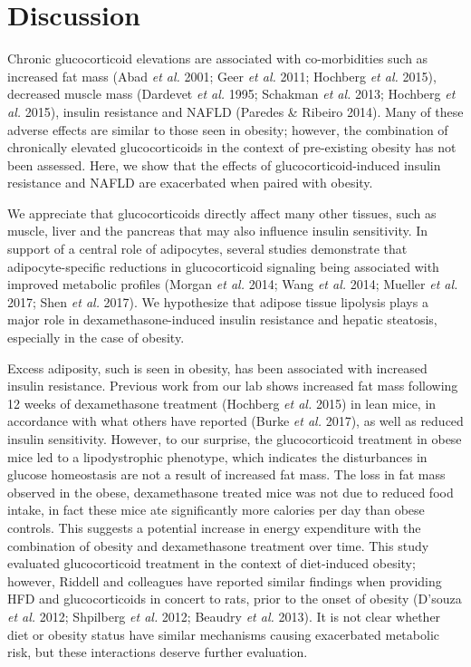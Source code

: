 \documentclass[11pt]{article} %
\begin{document}
\section*{Discussion}

Chronic glucocorticoid elevations are associated with co-morbidities
such as increased fat mass (Abad \emph{et al.} 2001; Geer \emph{et al.}
2011; Hochberg \emph{et al.} 2015), decreased muscle mass (Dardevet
\emph{et al.} 1995; Schakman \emph{et al.} 2013; Hochberg \emph{et al.}
2015), insulin resistance and NAFLD (Paredes \& Ribeiro 2014). Many of
these adverse effects are similar to those seen in obesity; however, the
combination of chronically elevated glucocorticoids in the context of
pre-existing obesity has not been assessed. Here, we show that the
effects of glucocorticoid-induced insulin resistance and NAFLD are
exacerbated when paired with obesity.

We appreciate that glucocorticoids directly affect many other tissues,
such as muscle, liver and the pancreas that may also influence insulin
sensitivity. In support of a central role of adipocytes, several studies
demonstrate that adipocyte-specific reductions in glucocorticoid
signaling being associated with improved metabolic profiles (Morgan
\emph{et al.} 2014; Wang \emph{et al.} 2014; Mueller \emph{et al.} 2017;
Shen \emph{et al.} 2017). We hypothesize that adipose tissue lipolysis
plays a major role in dexamethasone-induced insulin resistance and
hepatic steatosis, especially in the case of obesity.

Excess adiposity, such is seen in obesity, has been associated with
increased insulin resistance. Previous work from our lab shows increased
fat mass following 12 weeks of dexamethasone treatment (Hochberg
\emph{et al.} 2015) in lean mice, in accordance with what others have
reported (Burke \emph{et al.} 2017), as well as reduced insulin
sensitivity. However, to our surprise, the glucocorticoid treatment in
obese mice led to a lipodystrophic phenotype, which indicates the
disturbances in glucose homeostasis are not a result of increased fat
mass. The loss in fat mass observed in the obese, dexamethasone treated
mice was not due to reduced food intake, in fact these mice ate
significantly more calories per day than obese controls. This suggests a
potential increase in energy expenditure with the combination of obesity
and dexamethasone treatment over time. This study evaluated
glucocorticoid treatment in the context of diet-induced obesity;
however, Riddell and colleagues have reported similar findings when
providing HFD and glucocorticoids in concert to rats, prior to the onset
of obesity (D'souza \emph{et al.} 2012; Shpilberg \emph{et al.} 2012;
Beaudry \emph{et al.} 2013). It is not clear whether diet or obesity
status have similar mechanisms causing exacerbated metabolic risk, but
these interactions deserve further evaluation.
\end{document}
